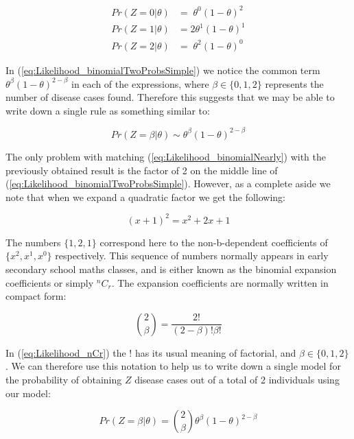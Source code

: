 \documentclass[11pt,fullpage]{book}
\begin{document}
\begin{align}\label{eq:Likelihood_binomialTwoProbsSimple}
Pr(Z = 0|\theta)& = \;\theta^0(1-\theta)^2\\
Pr(Z = 1|\theta)& = 2\theta^1(1-\theta)^1\\
Pr(Z = 2|\theta)& = \;\theta^2(1-\theta)^0
\end{align}

In (\ref{eq:Likelihood_binomialTwoProbsSimple}) we notice the common term $\theta^\beta (1-\theta)^{2-\beta}$ in each of the expressions, where $\beta\in\{0,1,2\}$ represents the number of disease cases found. Therefore this suggests that we may be able to write down a single rule as something similar to:

\begin{equation}\label{eq:Likelihood_binomialNearly}
Pr(Z = \beta|\theta) \sim \theta^\beta(1-\theta)^{2-\beta}
\end{equation}

The only problem with matching (\ref{eq:Likelihood_binomialNearly}) with the previously obtained result is the factor of 2 on the middle line of (\ref{eq:Likelihood_binomialTwoProbsSimple}). However, as a complete aside we note that when we expand a quadratic factor we get the following:

\begin{equation}\label{eq:Likelihood_quadratic}
(x+1)^2 = x^2 + 2x + 1
\end{equation}

The numbers $\{1,2,1\}$ correspond here to the non-b-dependent coefficients of $\{x^2,x^1,x^0\}$ respectively. This sequence of numbers normally appears in early secondary school maths classes, and is either known as the binomial expansion coefficients or simply $^nC_r$. The expansion coefficients are normally written in compact form:

\begin{equation}\label{eq:Likelihood_nCr}
{2 \choose \beta} = \frac{2!}{(2-\beta)!\beta!}
\end{equation}

In (\ref{eq:Likelihood_nCr}) the $!$ has its usual meaning of factorial, and $\beta\in\{0,1,2\}$. We can therefore use this notation to help us to write down a single model for the probability of obtaining $Z$ disease cases out of a total of 2 individuals using our model:

\begin{equation}\label{eq:Likelihood_binomialTwoFull}
Pr(Z=\beta|\theta) = {2 \choose \beta} \theta^\beta (1-\theta)^{2-\beta}
\end{equation}
\end{document}

